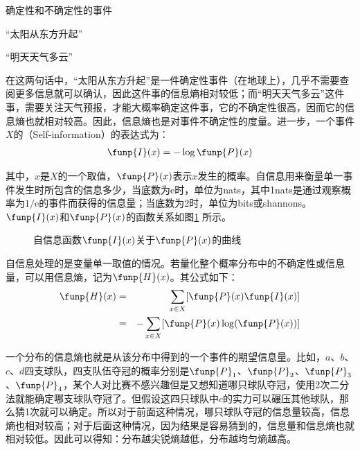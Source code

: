 \begin{example}
确定性和不确定性的事件

\qquad\qquad\quad“太阳从东方升起”

\qquad\qquad\quad“明天天气多云”
\label{eg:2-1}
\end{example}

\parinterval 在这两句话中，“太阳从东方升起”是一件确定性事件（在地球上），几乎不需要查阅更多信息就可以确认，因此这件事的信息熵相对较低；而“明天天气多云”这件事，需要关注天气预报，才能大概率确定这件事，它的不确定性很高，因而它的信息熵也就相对较高。因此，信息熵也是对事件不确定性的度量。进一步，一个事件$X$的{\small{}}（Self-information）的表达式为：
\begin{eqnarray}
\funp{I}(x)=-\log \funp{P}(x)
\label{eq:2-13}
\end{eqnarray}

\noindent 其中，$x$是$X$的一个取值，$\funp{P}(x)$表示$x$发生的概率。自信息用来衡量单一事件发生时所包含的信息多少，当底数为e时，单位为nats，其中1nats是通过观察概率为$1/\textrm{e}$的事件而获得的信息量；当底数为2时，单位为bits或shannons。$\funp{I}(x)$和$\funp{P}(x)$的函数关系如图\ref{fig:2-3} 所示。

\begin{figure}[htp]
\centering

\caption{自信息函数$\funp{I}(x)$关于$\funp{P}(x)$的曲线}
\label{fig:2-3}
\end{figure}

\parinterval 自信息处理的是变量单一取值的情况。若量化整个概率分布中的不确定性或信息量，可以用信息熵，记为$\funp{H}(x)$。其公式如下：
\begin{eqnarray}
\funp{H}(x) & = & \sum_{x \in X}[ \funp{P}(x) \funp{I}(x)] \nonumber \\
              & = & - \sum_{x \in X } [\funp{P}(x)\log(\funp{P}(x)) ]
\label{eq:2-14}
\end{eqnarray}

\parinterval 一个分布的信息熵也就是从该分布中得到的一个事件的期望信息量。比如，$a$、$b$、$c$、$d$四支球队，四支队伍夺冠的概率分别是$\funp{P}_1$、$\funp{P}_2$、$\funp{P}_3$、$\funp{P}_4$，某个人对比赛不感兴趣但是又想知道哪只球队夺冠，使用2次二分法就能确定哪支球队夺冠了。但假设这四只球队中$c$的实力可以碾压其他球队，那么猜1次就可以确定。所以对于前面这种情况，哪只球队夺冠的信息量较高，信息熵也相对较高；对于后面这种情况，因为结果是容易猜到的，信息量和信息熵也就相对较低。因此可以得知：分布越尖锐熵越低，分布越均匀熵越高。

